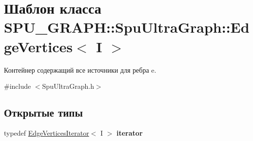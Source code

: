 \hypertarget{class_s_p_u___g_r_a_p_h_1_1_spu_ultra_graph_1_1_edge_vertices}{}\section{Шаблон класса S\+P\+U\+\_\+\+G\+R\+A\+PH\+:\+:Spu\+Ultra\+Graph\+:\+:Edge\+Vertices$<$ I $>$}
\label{class_s_p_u___g_r_a_p_h_1_1_spu_ultra_graph_1_1_edge_vertices}


Контейнер содержащий все источники для ребра e.  




{\ttfamily \#include $<$Spu\+Ultra\+Graph.\+h$>$}

\subsection*{Открытые типы}
\begin{DoxyCompactItemize}
\item 
\mbox{\label{class_s_p_u___g_r_a_p_h_1_1_spu_ultra_graph_1_1_edge_vertices_a73c467cb9960883efec3d69ce0d294ab}} 
typedef \hyperlink{class_s_p_u___g_r_a_p_h_1_1_spu_ultra_graph_1_1_edge_vertices_iterator}{Edge\+Vertices\+Iterator}$<$ I $>$ {\bfseries iterator}
\end{DoxyCompactItemize}
